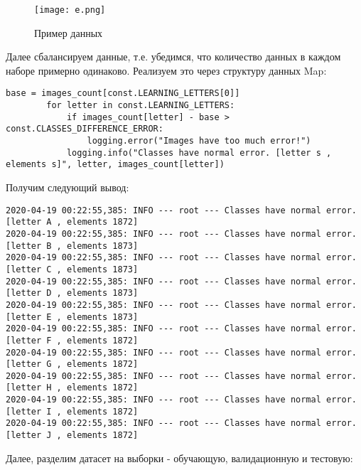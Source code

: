 \begin{figure}[h]
\centering
	\texttt{[image: e.png]}
	\caption{Пример данных}
	\label{sec:purpose:payings}
\end{figure}

Далее сбалансируем данные, т.е. убедимся, что количество данных в каждом наборе примерно одинаково. Реализуем это через структуру данных Map:

\begin{lstlisting}
base = images_count[const.LEARNING_LETTERS[0]]
        for letter in const.LEARNING_LETTERS:
            if images_count[letter] - base > const.CLASSES_DIFFERENCE_ERROR:
                logging.error("Images have too much error!")
            logging.info("Classes have normal error. [letter s , elements s]", letter, images_count[letter])
\end{lstlisting}

Получим следующий вывод:

\begin{lstlisting}
2020-04-19 00:22:55,385: INFO --- root --- Classes have normal error. [letter A , elements 1872]
2020-04-19 00:22:55,385: INFO --- root --- Classes have normal error. [letter B , elements 1873]
2020-04-19 00:22:55,385: INFO --- root --- Classes have normal error. [letter C , elements 1873]
2020-04-19 00:22:55,385: INFO --- root --- Classes have normal error. [letter D , elements 1873]
2020-04-19 00:22:55,385: INFO --- root --- Classes have normal error. [letter E , elements 1873]
2020-04-19 00:22:55,385: INFO --- root --- Classes have normal error. [letter F , elements 1872]
2020-04-19 00:22:55,385: INFO --- root --- Classes have normal error. [letter G , elements 1872]
2020-04-19 00:22:55,385: INFO --- root --- Classes have normal error. [letter H , elements 1872]
2020-04-19 00:22:55,385: INFO --- root --- Classes have normal error. [letter I , elements 1872]
2020-04-19 00:22:55,385: INFO --- root --- Classes have normal error. [letter J , elements 1872]
\end{lstlisting}

Далее, разделим датасет на выборки - обучающую, валидационную и тестовую:

